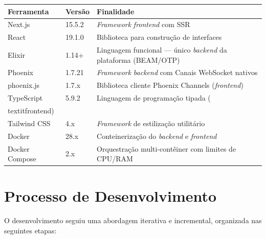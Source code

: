 \documentclass[
	12pt,
	openany,
	oneside,
	a4paper,
	english,
	brazil
]{abntex2}
\begin{document}
\begin{quadro}[htb]
\caption{\label{quad:ferramentas}Ferramentas e tecnologias utilizadas}
\begin{tabular}{|p{3.5cm}|p{3cm}|p{6.5cm}|}
	\hline
	\textbf{Ferramenta} & \textbf{Versão} & \textbf{Finalidade} \\ \hline
	Next.js & 15.5.2 & \textit{Framework} \textit{frontend} com SSR \\ \hline
	React & 19.1.0 & Biblioteca para construção de interfaces \\ \hline
	Elixir & 1.14+ & Linguagem funcional --- único \textit{backend} da plataforma (BEAM/OTP) \\ \hline
	Phoenix & 1.7.21 & \textit{Framework} \textit{backend} com Canais WebSocket nativos \\ \hline
	phoenix.js & 1.7.x & Biblioteca cliente Phoenix Channels (\textit{frontend}) \\ \hline
	TypeScript & 5.9.2 & Linguagem de programação tipada (\\textit{frontend}) \\ \hline
	Tailwind CSS & 4.x & \textit{Framework} de estilização utilitário \\ \hline
	Docker & 28.x & Conteinerização do \textit{backend} e \textit{frontend} \\ \hline
	Docker Compose & 2.x & Orquestração multi-contêiner com limites de CPU/RAM \\ \hline
\end{tabular}
\end{quadro}

\section{Processo de Desenvolvimento}

O desenvolvimento seguiu uma abordagem iterativa e incremental, organizada nas seguintes etapas:
\end{document}
